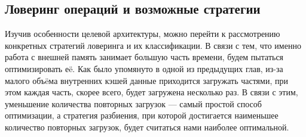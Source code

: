 \subsection{Ловеринг операций и возможные стратегии}
\label{impl:lowering} %

Изучив особенности целевой архитектуры, можно перейти к рассмотрению
конкретных стратегий ловеринга и их классификации. В связи с тем, что именно
работа с внешней память занимает большую часть времени, будем пытаться
оптимизировать еë. Как было упомянуто в одной из предыдущих глав, из-за малого
объëма внутренних кэшей данные приходится загружать частями, при этом каждая часть,
скорее всего, будет загружена несколько раз. В связи с этим, уменьшение количества
повторных загрузок --- самый простой способ оптимизации, а стратегия разбиения,
при которой достигается наименьшее количество повторных загрузок, будет считаться
нами наиболее оптимальной.
